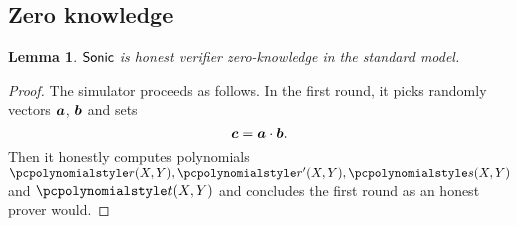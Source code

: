 \let\accentvec\vec \documentclass[runningheads,10pt]{llncs}
\def\vec#1{\mathchoice{\mbox{\boldmath$\displaystyle#1$}}
{\mbox{\boldmath$\textstyle#1$}} {\mbox{\boldmath$\scriptstyle#1$}}
{\mbox{\boldmath$\scriptscriptstyle#1$}}}
\newtheorem{lemma}[theorem]{Lemma}
\begin{document}
\subsection{Zero knowledge}
\begin{lemma}
	${\textnormal{\textsf{Sonic}}}$ is honest verifier zero-knowledge in the standard model.	
\end{lemma}
\begin{proof}
The simulator proceeds as follows.
In the first round, it picks randomly vectors $\vec{a}$, $\vec{b}$ and sets
\begin{equation}
		\label{eq:ab_eq_c}
		\vec{c} = \vec{a} \cdot \vec{b}. 
\end{equation}
Then it honestly computes polynomials
$\p{r}(X, Y), \p{r'}(X, Y), \p{s}(X, Y)$ and $\p{t}(X, Y)$ and concludes the
first round as an honest prover would. 


\end{proof}
\end{document}
